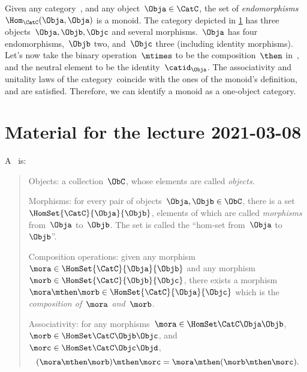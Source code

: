 \begin{example}
  Given any category~\CatC, and any object~$\Obja\in \CatC$, the set of \emph{endomorphisms}~$\Hom_{\CatC}(\Obja,\Obja)$ is a monoid. The category depicted in \cref{fig:monoid_endomorphisms} has three objects~$\Obja,\Objb,\Objc$ and several morphisms.~$\Obja$ has four endomorphisms,~$\Objb$ two, and~$\Objc$ three (including identity morphisms). Let's now take the binary operation~$\mtimes$ to be the composition~$\then$ in~\CatC, and the neutral element to be the identity~$\catid_\Obja$. The associativity and unitality laws of the category~\CatC coincide with the ones of the monoid's definition, and are satisfied. Therefore, we can identify a monoid as a one-object category.
\end{example}


\begin{figure}[h!]
  \begin{center}
    \caption{}
    \label{fig:monoid_endomorphisms}
  \end{center}
\end{figure}



\section{Material for the lecture 2021-03-08}


\begin{ctdefinition}[Semicategory]
  \label{def:categorymain}
  A \emph{}~\CatC is:
\begin{quote}
    \constit
  \begin{compactenum}
    \item Objects: a collection\footnotemark~$\ObC$, whose elements are called \emph{objects}.
    \item Morphisms: for every pair of objects~$\Obja,\Objb\in \ObC$, there is a set~$\HomSet{\CatC}{\Obja}{\Objb}$, elements of which are called
    \emph{morphisms} from~$\Obja$ to~$\Objb$. The set is called the ``hom-set from~$\Obja$ to~$\Objb$''.
    \item Composition operations: given any morphism~${\mora} \in  \HomSet{\CatC}{\Obja}{\Objb}$ and any morphism~${\morb} \in \HomSet{\CatC}{\Objb}{\Objc}$, there exists a morphism~$\mora \mthen \morb\in \HomSet{\CatC}{\Obja}{\Objc}$ which is the \emph{composition of~$\mora$ and~$\morb$}.
  \end{compactenum}
 \condit
  \begin{compactenum}
    \item Associativity: for any morphisms~$\mora\in \HomSet\CatC\Obja\Objb$,~$\morb\in \HomSet\CatC\Objb\Objc$, and~$\morc\in \HomSet\CatC\Objc\Objd$,
    \begin{equation}
    (\mora\mthen \morb)
      \mthen \morc= \mora \mthen (\morb \mthen \morc).
    \end{equation}
  \end{compactenum}
  \end{quote}
\end{ctdefinition}

